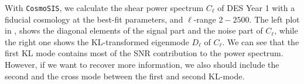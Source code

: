 \documentclass[twocolumn]{\docclass}
\def\bea{\begin{eqnarray}}
\def\eea{\end{eqnarray}}
\def\svs{\nonumber\\}
\begin{document}
	
	With  {\tt CosmoSIS}, we calculate the shear power spectrum $C_{\ell}$ of DES Year 1 with a fiducial cosmology at the best-fit parameters, and $\ell$-range $2-2500$. The left plot in , shows the diagonal elements of the signal part and the noise part of $C_{\ell}$, while the right one shows the KL-transformed eigenmode $D_{\ell}$ of $C_{\ell}$. We can see that the first KL mode contains most of the SNR contribution to the power spectrum. However, if we want to recover more information, we also should include the second and the cross mode between the first and second KL-mode.
	
\end{document}
